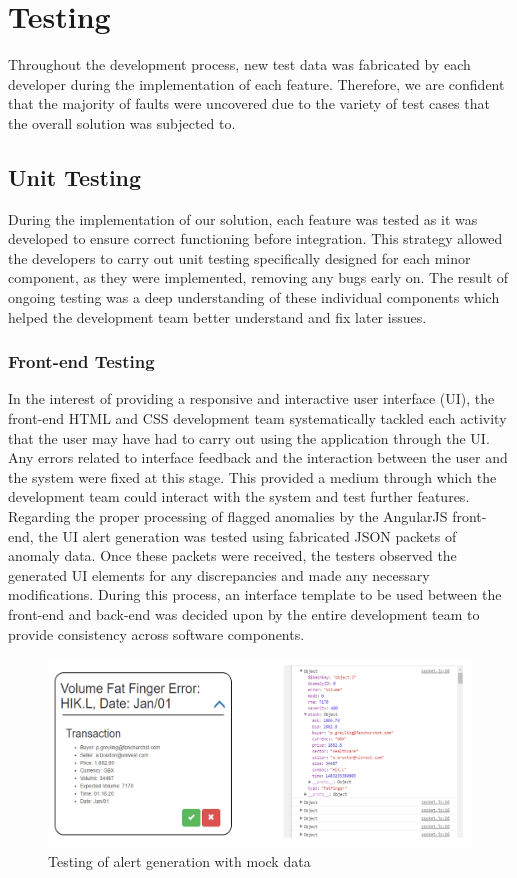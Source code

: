 \documentclass[12pt]{article}
\begin{document}
\section{Testing}
  Throughout the development process, new test data was fabricated by each developer during the implementation of each feature.
  Therefore, we are confident that the majority of faults were uncovered due to the variety of test cases that the overall solution was subjected to.
  \subsection{Unit Testing}
  During the implementation of our solution, each feature was tested as it was developed to ensure correct functioning before integration.
  This strategy allowed the developers to carry out unit testing specifically designed for each minor component, as they were implemented, removing any bugs early on.
  The result of ongoing testing was a deep understanding of these individual components which helped the development team better understand and fix later issues.
    \subsubsection{Front-end Testing}
    In the interest of providing a responsive and interactive user interface (UI), the front-end HTML and CSS development team systematically tackled each activity
    that the user may have had to carry out using the application through the UI. Any errors related to interface feedback and the interaction between the user and the system were fixed at this stage.
    This provided a medium through which the development team could interact with the system and test further features.
    \newline
    Regarding the proper processing of flagged anomalies by the AngularJS front-end, the UI alert generation was tested using fabricated JSON packets of anomaly data.
    Once these packets were received, the testers observed the generated UI elements for any discrepancies and made any necessary modifications.
    During this process, an interface template to be used between the front-end and back-end was decided upon by the entire development team to provide consistency across software components.
    \begin{figure}[H]
    \centering
    \includegraphics[width=130mm]{test1.png}
    \caption{Testing of alert generation with mock data}
    \end{figure}
\end{document}
